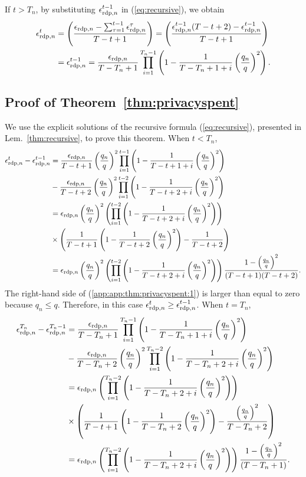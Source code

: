 If $t> T_n$, by substituting ${\epsilon}_{\text{rdp}, n}^{t-1}$ in (\ref{eq:recursive}), we obtain
\begin{align}
    {\epsilon}_{\text{rdp}, n}^{t} &= \left(\frac{{\epsilon}_{\text{rdp}, n}-\sum_{\tau = 1}^{t-1} {\epsilon}_{\text{rdp}, n}^{\tau}}{T-t+1}\right)
    = \left(\frac{{\epsilon}_{\text{rdp}, n}^{t-1}(T-t+2)- {\epsilon}_{\text{rdp}, n}^{t-1}}{T-t+1}\right)
    \\
    &= {\epsilon}_{\text{rdp}, n}^{t-1} = 
     \frac{{\epsilon}_{\text{rdp}, n}}{T-T_n+1}\prod_{i=1}^{T_n-1} \left(1-\frac{1}{T-T_n+1+i}\left(\frac{q_n}{q}\right)^2\right). 
\end{align}



\subsection{Proof of Theorem~\ref{thm:privacyspent}}\label{app:thm:privacyspent}
We use the explicit solutions of the recursive formula (\ref{eq:recursive}), presented in Lem.~\ref{thm:recursive}, to prove this theorem. When $t< T_n$, 
\begin{align}
    {\epsilon}_{\text{rdp}, n}^t - {\epsilon}_{\text{rdp}, n}^{t-1} &=  \frac{{\epsilon}_{\text{rdp}, n}}{T-t+1}\left(\frac{q_n}{q}\right)^2\prod_{i=1}^{t-1} \left(1-\frac{1}{T-t+1+i}\left(\frac{q_n}{q}\right)^2\right)  
    \\
    &-
    \frac{{\epsilon}_{\text{rdp}, n}}{T-t+2}\left(\frac{q_n}{q}\right)^2\prod_{i=1}^{t-2} \left(1-\frac{1}{T-t+2+i}\left(\frac{q_n}{q}\right)^2\right)
    \\
    &={\epsilon}_{\text{rdp}, n}\left(\frac{q_n}{q}\right)^2\left(\prod_{i=1}^{t-2} \left(1-\frac{1}{T-t+2+i}\left(\frac{q_n}{q}\right)^2\right)\right)
    \\
    &\times \left(\frac{1}{T-t+1}\left(1-\frac{1}{T-t+2}\left(\frac{q_n}{q}\right)^2\right) - \frac{1}{T-t+2}\right)
    \\
    &={\epsilon}_{\text{rdp}, n}\left(\frac{q_n}{q}\right)^2\left(\prod_{i=1}^{t-2} \left(1-\frac{1}{T-t+2+i}\left(\frac{q_n}{q}\right)^2\right)\right) \frac{1-\left(\frac{q_n}{q}\right)^2}{(T-t+1)(T-t+2)}.\label{app:app:thm:privacyspent:1}
\end{align}
The right-hand side of (\ref{app:app:thm:privacyspent:1}) is larger than equal to zero because $q_n \leq q$. Therefore, in this case ${\epsilon}_{\text{rdp}, n}^t \geq {\epsilon}_{\text{rdp}, n}^{t-1}$. When $t= T_n$,
\begin{align}
    {\epsilon}_{\text{rdp}, n}^{T_n} - {\epsilon}_{\text{rdp}, n}^{T_n-1} &=  \frac{{\epsilon}_{\text{rdp}, n}}{T-T_n+1}\prod_{i=1}^{T_n-1} \left(1-\frac{1}{T-T_n+1+i}\left(\frac{q_n}{q}\right)^2\right)  
    \\
    &-
    \frac{{\epsilon}_{\text{rdp}, n}}{T-T_n+2}\left(\frac{q_n}{q}\right)^2\prod_{i=1}^{T_n-2} \left(1-\frac{1}{T-T_n+2+i}\left(\frac{q_n}{q}\right)^2\right)
    \\
    &={\epsilon}_{\text{rdp}, n}\left(\prod_{i=1}^{T_n-2} \left(1-\frac{1}{T-T_n+2+i}\left(\frac{q_n}{q}\right)^2\right)\right)
    \\
    &\times \left(\frac{1}{T-t+1}\left(1-\frac{1}{T-T_n+2}\left(\frac{q_n}{q}\right)^2\right) - \frac{\left(\frac{q_n}{q}\right)^2}{T-T_n+2}\right)
    \\
    &={\epsilon}_{\text{rdp}, n}\left(\prod_{i=1}^{T_n-2} \left(1-\frac{1}{T-T_n+2+i}\left(\frac{q_n}{q}\right)^2\right)\right) \frac{1-\left(\frac{q_n}{q}\right)^2}{(T-T_n+1)}.\label{app:app:thm:privacyspent:2}
\end{align}
